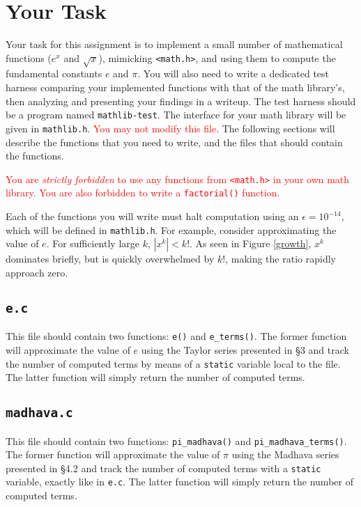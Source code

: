 \section{Your Task}

Your task for this assignment is to implement a small number of
mathematical functions ($e^x$ and $\sqrt{x}$), mimicking
\texttt{<math.h>}, and using them to compute the fundamental constants
$e$ and $\pi$. You will also need to write a dedicated test harness
comparing your implemented functions with that of the math library's,
then analyzing and presenting your findings in a writeup. The test
harness should be a program named \texttt{mathlib-test}. The interface
for your math library will be given in \texttt{mathlib.h}.
\textcolor{red}{You may not modify this file.} The following sections
will describe the functions that you need to write, and the files that
should contain the functions.

\textcolor{red}{You are \emph{strictly forbidden} to use any functions
from \texttt{<math.h>} in your own math library. You are also forbidden
to write a \texttt{factorial()} function.}

Each of the functions you will write must halt computation using an
$\epsilon = 10^{-14}$, which will be defined in \texttt{mathlib.h}. For
example, consider approximating the value of $e$. For sufficiently large
$k$, $|x^k| < k!$. As seen in Figure \ref{growth}, $x^k$ dominates
briefly, but is quickly overwhelmed by $k!$, making the ratio rapidly
approach zero.

\subsection{\texttt{e.c}}

This file should contain two functions: \texttt{e()} and
\texttt{e\_terms()}. The former function will approximate the value of
$e$ using the Taylor series presented in \S3 and track the number of
computed terms by means of a \texttt{static} variable local to the file.
The latter function will simply return the number of computed terms.

\subsection{\texttt{madhava.c}}

This file should contain two functions: \texttt{pi\_madhava()} and
\texttt{pi\_madhava\_terms()}. The former function will approximate the
value of $\pi$ using the Madhava series presented in \S4.2 and track the
number of computed terms with a \texttt{static} variable, exactly like
in \texttt{e.c}. The latter function will simply return the number of
computed terms.

